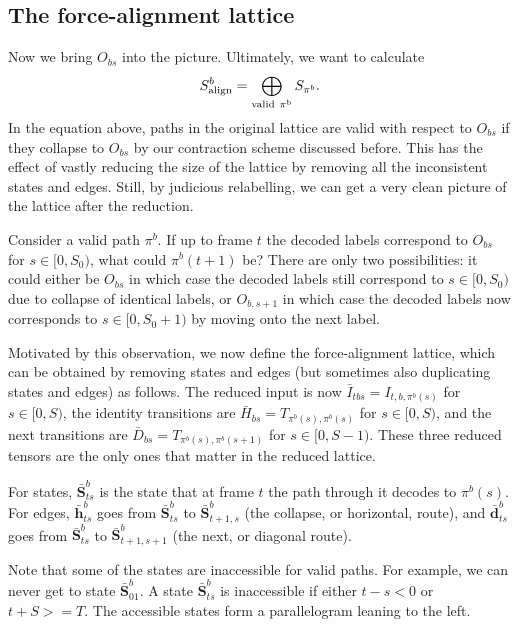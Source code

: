 \documentclass[a4paper]{article}
\begin{document}
\subsection{The force-alignment lattice}

Now we bring $O_{bs}$ into the picture. Ultimately, we want to calculate
\begin{equation}
S^b_{\rm{align}} = \bigoplus_{\rm{valid~}\pi^b}S_{\pi^b}.
\end{equation}
In the equation above, paths in the original lattice are valid with respect to $O_{bs}$ if they collapse to $O_{bs}$ by our contraction scheme discussed before. This has the effect of vastly reducing the size of the lattice by removing all the inconsistent states and edges. Still, by judicious relabelling, we can get a very clean picture of the lattice after the reduction.

Consider a valid path $\pi^b$. If up to frame $t$ the decoded labels correspond to $O_{bs}$ for $s\in [0, S_0)$, what could $\pi^b(t+1)$ be? There are only two possibilities: it could either be $O_{bs}$ in which case the decoded labels still correspond to $s\in [0, S_0)$ due to collapse of identical labels, or $O_{b,s+1}$ in which case the decoded labels now corresponds to $s\in [0, S_0+1)$ by moving onto the next label.

Motivated by this observation, we now define the force-alignment lattice, which can be obtained by removing states and edges (but sometimes also duplicating states and edges) as follows. The reduced input is now $\bar{I}_{tbs} = I_{t,b,\pi^b(s)}$ for $s \in [0, S)$, the identity transitions are $\bar{H}_{bs} = T_{\pi^b(s),\pi^b(s)}$ for $s \in [0, S)$, and the next transitions are $\bar{D}_{bs} = T_{\pi^b(s),\pi^b(s+1)}$ for $s \in [0, S-1)$. These three reduced tensors are the only ones that matter in the reduced lattice.

For states, $\bar{\mathbf{S}}^b_{ts}$ is the state that at frame $t$ the path through it decodes to $\pi^b(s)$. For edges, $\bar{\mathbf{h}}^b_{ts}$ goes from $\bar{\mathbf{S}}^b_{ts}$ to $\bar{\mathbf{S}}^b_{t+1,s}$ (the collapse, or horizontal, route), and $\bar{\mathbf{d}}^b_{ts}$ goes from $\bar{\mathbf{S}}^b_{ts}$ to $\bar{\mathbf{S}}^b_{t+1,s+1}$ (the next, or diagonal route).

Note that some of the states are inaccessible for valid paths. For example, we can never get to state $\bar{\mathbf{S}}^b_{01}$. A state $\bar{\mathbf{S}}^b_{ts}$ is inaccessible if either $t-s<0$ or $t+S>=T$. The accessible states form a parallelogram leaning to the left.
\end{document}
